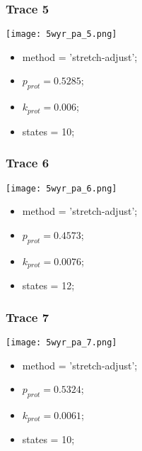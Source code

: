 \subsubsection{Trace 5}
\begin{minipage}[c]{0.7\textwidth}
    \texttt{[image: 5wyr\_pa\_5.png]}
\end{minipage}
\hfill
\begin{minipage}[c]{0.45\textwidth}
    \begin{itemize}
        \item method = 'stretch-adjust';
        \item $p_{prot}=0.5285$;
        \item $k_{prot}=0.006$;
        \item states = 10;
    \end{itemize}
\end{minipage}

\subsubsection{Trace 6}
\begin{minipage}[c]{0.7\textwidth}
    \texttt{[image: 5wyr\_pa\_6.png]}
\end{minipage}
\hfill
\begin{minipage}[c]{0.45\textwidth}
    \begin{itemize}
        \item method = 'stretch-adjust';
        \item $p_{prot}=0.4573$;
        \item $k_{prot}=0.0076$;
        \item states = 12;
    \end{itemize}
\end{minipage}

\subsubsection{Trace 7}
\begin{minipage}[c]{0.7\textwidth}
    \texttt{[image: 5wyr\_pa\_7.png]}
\end{minipage}
\hfill
\begin{minipage}[c]{0.45\textwidth}
    \begin{itemize}
        \item method = 'stretch-adjust';
        \item $p_{prot}=0.5324$;
        \item $k_{prot}=0.0061$;
        \item states = 10;
    \end{itemize}
\end{minipage}

